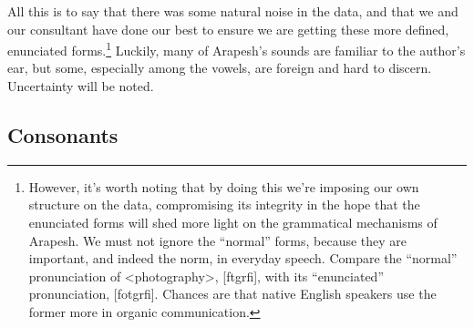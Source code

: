 \documentclass[pdftex,12pt,letterpaper]{article}
\let\ipa\textipa
\begin{document}
All this is to say that there was some natural noise in the data, and that we and our consultant have done our best to ensure we are getting these more defined, enunciated forms.\footnote{However, it's worth noting that by doing this we're imposing our own structure on the data, compromising its integrity in the hope that the enunciated forms will shed more light on the grammatical mechanisms of Arapesh. We must not ignore the ``normal'' forms, because they are important, and indeed the norm, in everyday speech. Compare the ``normal'' pronunciation of \textless photography\textgreater, {[f\ipa{@}t\ipa{O}gr\ipa{@}fi]}, with its ``enunciated'' pronunciation, {[fot\ipa{O}gr\ipa{@}fi]}. Chances are that native English speakers use the former more in organic communication.} Luckily, many of Arapesh's sounds are familiar to the author's ear, but some, especially among the vowels, are foreign and hard to discern. Uncertainty will be noted.

\subsection{Consonants}
\end{document}
